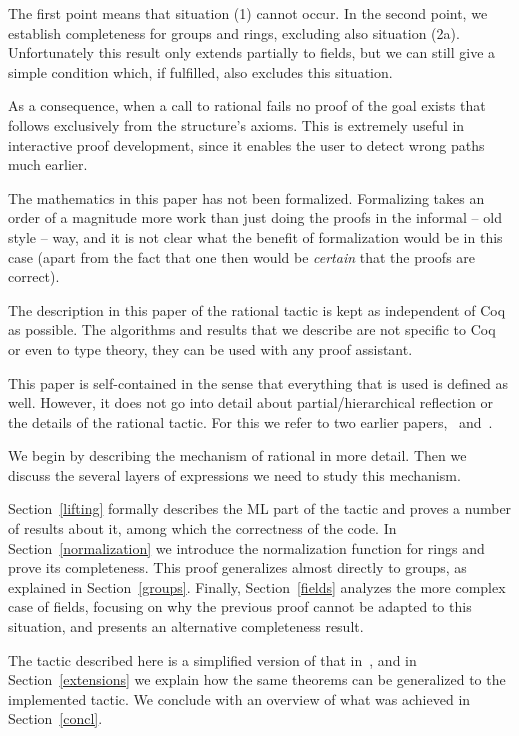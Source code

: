 \documentclass{article}
\newcommand{\tacticname}[1]{\textsf{#1}}
\newcommand{\rational}{\tacticname{rational}}
\begin{document}
The first point means that situation (1) cannot occur.  In the second
point, we establish completeness for groups and rings, excluding also
situation (2a).  Unfortunately this result only extends partially to
fields, but we can still give a simple condition which, if fulfilled,
also excludes this situation.

As a consequence, when a call to {\rational} fails no proof of the goal
exists that follows exclusively from the structure's axioms.  This is
extremely useful in interactive proof development, since it enables the
user to detect wrong paths much earlier.

\bigskip

The mathematics in this paper has not been formalized.
Formalizing takes an order of a magnitude more work than just doing
the proofs in the informal -- old style -- way, and it is not clear
what the benefit of formalization would be in this case (apart from
the fact that one then would be \emph{certain} that the proofs are
correct).

The description in this paper of the {\rational} tactic
is kept as independent of Coq as possible.
The algorithms and results that we describe
are not specific to Coq or even to type theory,
they can be used with any proof assistant.

This paper is self-contained in the sense that everything that
is used is defined as well.
However, it does not go into detail about partial/hierarchical reflection
or the details of the {\rational} tactic.
For this we refer to two earlier papers,~\cite{geu:wie:zwa:00}
and~\cite{lcf:wie:04}.

We begin by describing the mechanism of {\rational} in more detail.
Then we discuss the several layers of expressions we need to study
this mechanism.

Section~\ref{lifting} formally describes the ML part of the tactic and
proves a number of results about it, among which the correctness of the
code.
In Section~\ref{normalization} we introduce the normalization function for
rings and prove its completeness.  This proof generalizes almost directly
to groups, as explained in Section~\ref{groups}.  Finally,
Section~\ref{fields} analyzes the more complex case of fields, focusing
on why the previous proof cannot be adapted to this situation, and presents
an alternative completeness result.

The tactic described here is a simplified version of that
in~\cite{lcf:wie:04}, and in Section~\ref{extensions} we explain how the
same theorems can be generalized to the implemented tactic.  We conclude
with an overview of what was achieved in Section~\ref{concl}.
\end{document}
